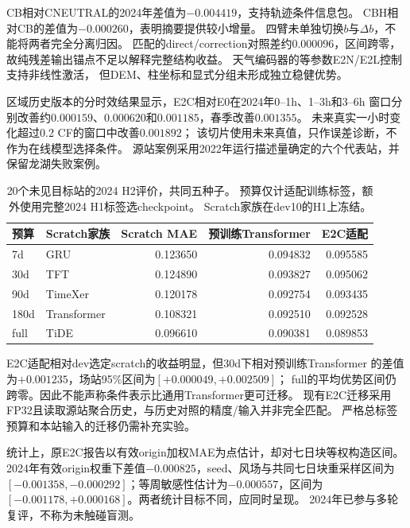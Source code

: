 CB相对CNEUTRAL的2024年差值为$-0.004419$，支持轨迹条件信息包。
CBH相对CB的差值为$-0.000260$，表明摘要提供较小增量。
四臂未单独切换$b$与$\Delta b$，不能将两者完全分离归因。
匹配的direct/correction对照差约$0.000096$，区间跨零，
故纯残差输出锚点不足以解释完整结构收益。
天气编码器的等参数E2N/E2L控制支持非线性激活，
但DEM、柱坐标和显式分组未形成独立稳健优势。

区域历史版本的分时效结果显示，E2C相对E0在2024年0--1h、1--3h和3--6h
窗口分别改善约$0.000159$、$0.000620$和$0.001185$，春季改善$0.001355$。
未来真实一小时变化超过0.2 CF的窗口中改善$0.001892$；
该切片使用未来真值，只作误差诊断，不作为在线模型选择条件。
源站案例采用2022年运行描述量确定的六个代表站，并保留龙湖失败案例。

\begin{table}[tbp]
\centering\small
\caption{20个未见目标站的2024 H2评价，共同五种子。
预算仅计适配训练标签，额外使用完整2024 H1标签选checkpoint。
Scratch家族在dev10的H1上冻结。}
\begin{tabular}{llrrr}
\toprule
预算 & Scratch家族 & Scratch MAE & 预训练Transformer & E2C适配\\
\midrule
7d & GRU & 0.123650 & 0.094832 & 0.095585\\
30d & TFT & 0.124890 & 0.093827 & 0.095062\\
90d & TimeXer & 0.120178 & 0.092754 & 0.093435\\
180d & Transformer & 0.108321 & 0.092510 & 0.092528\\
full & TiDE & 0.096610 & 0.090381 & 0.089853\\
\bottomrule
\end{tabular}
\end{table}

E2C适配相对dev选定scratch的收益明显，但30d下相对预训练Transformer
的差值为$+0.001235$，场站95\%区间为$[+0.000049,+0.002509]$；
full的平均优势区间仍跨零。因此不能声称条件表示比通用Transformer更可迁移。
现有E2C迁移采用FP32且读取源站聚合历史，与历史对照的精度/输入并非完全匹配。
严格总标签预算和本站输入的迁移仍需补充实验。

统计上，原E2C报告以有效origin加权MAE为点估计，却对七日块等权构造区间。
2024年有效origin权重下差值$-0.000825$，seed、风场与共同七日块重采样区间为
$[-0.001358,-0.000292]$；等周敏感性估计为$-0.000557$，区间为
$[-0.001178,+0.000168]$。两者统计目标不同，应同时呈现。
2024年已参与多轮复评，不称为未触碰盲测。
